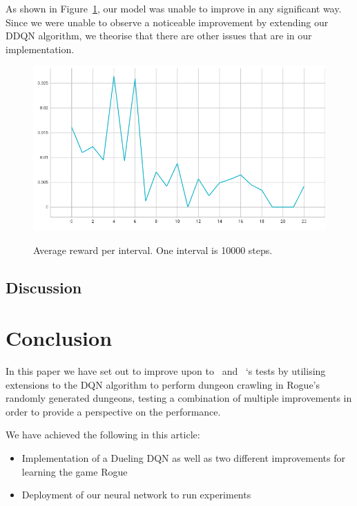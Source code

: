\documentclass[12pt,a4paper]{article}
\begin{document}
    As shown in Figure~\ref{fig:ddqn_noisy_interval_score}, our model was unable to improve in any significant way.
    Since we were unable to observe a noticeable improvement by extending our DDQN algorithm, we theorise that
    there are other issues that are in our implementation.
    \begin{figure}[H]
        \caption[DDQN/PER/NN: Average reward per interval.]{Average reward per interval. One interval is 10000 steps.}
        \centering
        \includegraphics[scale=0.5]{interval_score_ddqn_noisy}
        \label{fig:ddqn_noisy_interval_score}
    \end{figure}

    \subsection{Discussion} %


    \section{Conclusion}\label{sec:conclusion}
    In this paper we have set out to improve upon to~\citet{asperti18} and ~\citet{kanagawa19}`s tests by utilising extensions to the DQN algorithm
    to perform dungeon crawling in Rogue's randomly generated dungeons, testing a combination of multiple improvements in order to
    provide a perspective on the performance.

    We have achieved the following in this article:
    \begin{itemize}
        \item Implementation of a Dueling DQN as well as two different improvements for learning the game Rogue
        \item Deployment of our neural network to run experiments
    \end{itemize}
\end{document}
